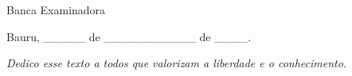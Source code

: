 \documentclass[
	12pt,				%
	openright,			%
	oneside,			%
	a4paper,			%
	english,			%
	french,				%
	spanish,			%
	brazil				%
	]{abntex2}
\begin{document}

%
% 
%
\begin{folhadeaprovacao}

  \begin{center}
    {\ABNTEXchapterfont\large\imprimirautor}

    \vspace*{\fill}\vspace*{\fill}
    \begin{center}
      \ABNTEXchapterfont\bfseries\Large\imprimirtitulo
    \end{center}
    \vspace*{\fill}

    \hspace{.45\textwidth}
    \begin{minipage}{.5\textwidth}
        \imprimirpreambulo
    \end{minipage}%
    \vspace*{\fill}
   \end{center}

   \center Banca Examinadora


   \begin{center}
    \vspace*{0.5cm}
    \par
    {Bauru, \_\_\_\_\_ de \_\_\_\_\_\_\_\_\_\_\_ de \_\_\_\_.}
    \vspace*{1cm}
  \end{center}

\end{folhadeaprovacao}

\begin{dedicatoria}
   \vspace*{\fill}
   \centering
   \noindent
   \textit{Dedico esse texto a todos que valorizam a liberdade e o conhecimento.}
   \vspace*{\fill}
\end{dedicatoria}
\end{document}
